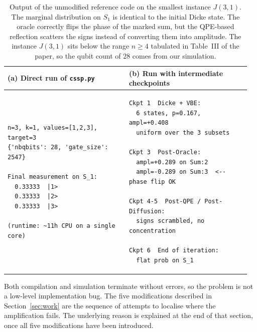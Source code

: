 \documentclass[11pt,a4paper]{article}
\begin{document}
\begin{table}[H]
\centering
\footnotesize
\begin{tabular}{@{}p{0.48\linewidth} p{0.48\linewidth}@{}}
\toprule
\textbf{(a) Direct run of \texttt{cssp.py}} &
\textbf{(b) Run with intermediate checkpoints} \\
\midrule
\begin{minipage}[t]{\linewidth}
\begin{lstlisting}[style=plain, basicstyle=\ttfamily\scriptsize]
n=3, k=1, values=[1,2,3], target=3
{'nbqbits': 28, 'gate_size': 2547}

Final measurement on S_1:
  0.33333  |1>
  0.33333  |2>
  0.33333  |3>

(runtime: ~11h CPU on a single core)
\end{lstlisting}
\end{minipage}
&
\begin{minipage}[t]{\linewidth}
\begin{lstlisting}[style=plain, basicstyle=\ttfamily\scriptsize]
Ckpt 1  Dicke + VBE:
  6 states, p=0.167, ampl=+0.408
  uniform over the 3 subsets

Ckpt 3  Post-Oracle:
  ampl=+0.289 on Sum:2
  ampl=-0.289 on Sum:3  <-- phase flip OK

Ckpt 4-5  Post-QPE / Post-Diffusion:
  signs scrambled, no concentration

Ckpt 6  End of iteration:
  flat prob on S_1
\end{lstlisting}
\end{minipage}\\
\bottomrule
\end{tabular}
\caption{Output of the unmodified reference code on the smallest instance $J(3,1)$. The marginal distribution on $S_1$ is identical to the initial Dicke state. The oracle correctly flips the phase of the marked sum, but the QPE-based reflection scatters the signs instead of converting them into amplitude. The instance $J(3,1)$ sits below the range $n \ge 4$ tabulated in Table~III of the paper, so the qubit count of $28$ comes from our simulation.}
\label{tab:baseline}
\end{table}

Both compilation and simulation terminate without errors, so the
problem is not a low-level implementation bug. The five
modifications described in Section~\ref{sec:work} are the sequence
of attempts to localise where the amplification fails. The
underlying reason is explained at the end of that section, once
all five modifications have been introduced.
\end{document}
